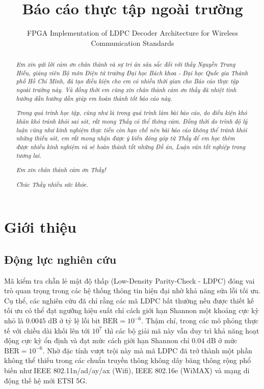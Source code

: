 \documentclass[12pt,a4paper,oneside]{book}
\title{Báo cáo thực tập ngoài trường} %
\subtitle{FPGA Implementation of LDPC Decoder Architecture for Wireless Communication Standards} %
\begin{document}
\coverpage

\frontmatter

\pagestyle{fancy}


\newpage
\begin{abstract}
\textit{Em xin gửi lời cảm ơn chân thành và sự tri ân sâu sắc đối với thầy Nguyễn Trung Hiếu, giảng viên Bộ môn Điện tử trường Đại học Bách khoa - Đại học Quốc gia Thành phố Hồ Chí Minh, đã tạo điều kiện cho em có nhiều thời gian cho Báo cáo thực tập ngoài trường này. Và đồng thời em cũng xin chân thành cảm ơn thầy đã nhiệt tình hướng dẫn hướng dẫn giúp em hoàn thành tốt báo cáo này.}

\textit{Trong quá trình học tập, cũng như là trong quá trình làm bài báo cáo, do điều kiện khó khăn khó tránh khỏi sai sót, rất mong Thầy có thể thông cảm. Đồng thời do trình độ lý luận cũng như kinh nghiệm thực tiễn còn hạn chế nên bài báo cáo không thể tránh khỏi những thiếu sót, em rất mong nhận được ý kiến đóng góp từ Thầy để em học thêm được nhiều kinh nghiệm và sẽ hoàn thành tốt những Đồ án, Luận văn tốt nghiệp trong tương lai.}

\textit{Em xin chân thành cảm ơn Thầy!}

\textit{Chúc Thầy nhiều sức khỏe.}

\end{abstract}

\tableofcontents
\listoffigures
\listoftables

\mainmatter


\chapter{Giới thiệu}
\section{Động lực nghiên cứu}
Mã kiểm tra chẵn lẻ mật độ thấp (Low-Density Parity-Check - LDPC) đóng vai trò quan trọng trong các hệ thống thông tin hiện đại nhờ khả năng sửa lỗi tối ưu. Cụ thể, các nghiên cứu \cite{1} đã chỉ rằng các mã LDPC bất thường nếu được thiết kế tối ưu có thể đạt ngưỡng hiệu suất chỉ cách giới hạn Shannon một khoảng cực kỳ nhỏ là $0.0045\text{ dB}$ ở tỷ lệ lỗi bit $\text{BER} = 10^{-6}$. Thậm chí, trong các mô phỏng thực tế với chiều dài khối lên tới $10^7$ thì các bộ giải mã này vẫn duy trì khả năng hoạt động cực kỳ ổn định và đạt mức cách giới hạn Shannon chỉ $0.04\text{ dB}$ ở mức $\text{BER} = 10^{-6}$. Nhờ đặc tính vượt trội này mà mã LDPC đã trở thành một phần không thể thiếu trong các chuẩn truyền thông không dây băng thông rộng phổ biến như IEEE 802.11n/ad/ay/ax (Wifi), IEEE 802.16e (WiMAX) và mạng di động thế hệ mới ETSI 5G.
\end{document}
